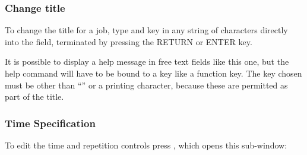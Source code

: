 \subsubsection{Change title}
To change the title for a job, type \userentry{{\textquotedbl}} and key in any string of
characters directly into the field, terminated by pressing the RETURN or ENTER key.

It is possible to display a help message in free text fields like this one, but the help command
will have to be bound to a key like a function key. The key chosen must be other than
``'' or a printing character, because these are permitted as part of the title.

\subsubsection{Time Specification}
To edit the time and repetition controls press , which opens this sub-window:

